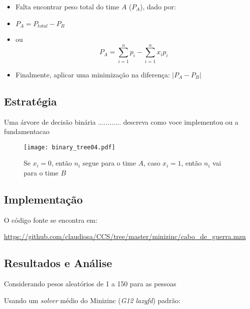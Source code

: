 
  \begin{itemize}
  \item Falta encontrar peso total do time $A$ ($P_A$), dado por: 

  \item $P_A = P_{total} - P_B$
  
  \item  ou $$P_A = \sum_{i=1}^n p_i - \sum_{i=1}^n x_i p_i$$   

  \item Finalmente, aplicar uma minimização  na diferença: $|P_A - P_B|$
  
  
  \end{itemize}

\subsection{Estratégia}%

Uma árvore de decisão binária ............ descreva como
voce implementou ou a fundamentacao

\begin{figure}[ht!]
 \centering
 \texttt{[image: binary\_tree04.pdf]}
\caption{Se $x_i=0$, então $n_i$ segue para o time $A$, caso  $x_i=1$, então  $n_i$ vai para o time $B$} 
\end{figure}

\subsection{Implementação}

O código fonte se encontra em:

\url{https://github.com/claudiosa/CCS/tree/master/minizinc/cabo_de_guerra.mzn}

\subsection{Resultados e Análise}


Considerando pesos aleatórios de 1 a 150 para as pessoas

Usando um \textit{solver} médio do Minizinc (\textit{G12 lazyfd}) padrão:

